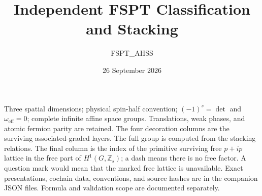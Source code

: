 \documentclass[10pt]{article}
\title{Independent FSPT Classification and Stacking}
\author{FSPT\_AHSS}
\date{26 September 2026}
\begin{document}
\maketitle
\noindent Three spatial dimensions; physical spin-half convention;
$(-1)^s=\det$ and $\omega_{\mathrm{eff}}=0$; complete infinite affine space groups.
Translations, weak phases, and atomic fermion parity are retained.
The four decoration columns are the surviving associated-graded layers.
The full group is computed from the stacking relations.
The final column is the index of the primitive surviving free $p+ip$ lattice
in the free part of $H^1(G,\mathbb Z_s)$; a dash means there is no free factor.
A question mark would mean that the marked free lattice is unavailable.
Exact presentations, cochain data, conventions, and source hashes are in the
companion JSON files. Formula and validation scope are documented separately.
\small
\end{document}
